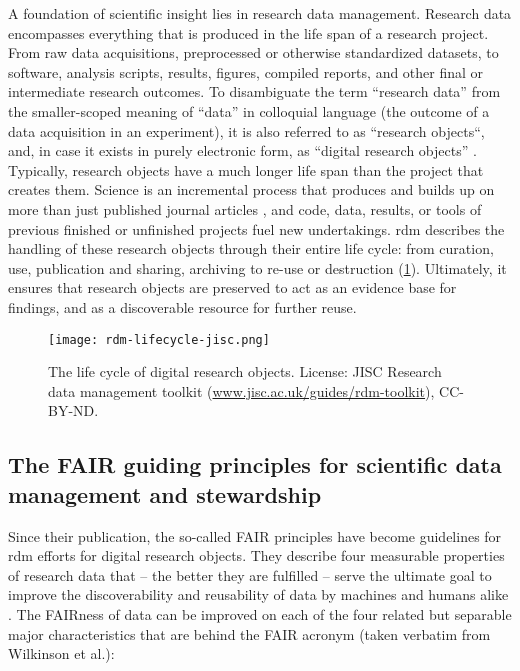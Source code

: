 A foundation of scientific insight lies in research data management.
Research data encompasses everything that is produced in the life span of a research project.
From raw data acquisitions, preprocessed or otherwise standardized datasets, to software, analysis scripts, results, figures, compiled reports, and other final or intermediate research outcomes.
To disambiguate the term ``research data'' from the smaller-scoped meaning of ``data'' in colloquial language (the outcome of a data acquisition in an experiment), it is also referred to as ``research objects``, and, in case it exists in purely electronic form, as ``digital research objects'' \citep{bechhofer2010research}. \\
Typically, research objects have a much longer life span than the project that creates them.
Science is an incremental process that produces and builds up on more than just published journal articles \citep{mons2018data}, and code, data, results, or tools of previous finished or unfinished projects fuel new undertakings.
\gls{rdm} describes the handling of these research objects through their entire life cycle: from curation, use, publication and sharing, archiving to re-use or destruction (\cref{fig:rdm-lifecycle}).
Ultimately, it ensures that research objects are preserved to act as an evidence base for findings, and as a discoverable resource for further reuse.


\begin{figure}[H]
	\centering
	\texttt{[image: rdm-lifecycle-jisc.png]}
	\caption[The life cycle of digital research objects]{The life cycle of digital research objects. License: JISC Research data management toolkit (\href{https://www.jisc.ac.uk/guides/rdm-toolkit}{www.jisc.ac.uk/guides/rdm-toolkit}), CC-BY-ND.}
	\label{fig:rdm-lifecycle}
\end{figure}


\subsection{The FAIR guiding principles for scientific data management and stewardship}

Since their publication, the so-called \gls{FAIR} principles \citep{wilkinson2016fair} have become guidelines for \gls{rdm} efforts for digital research objects.
They describe four measurable properties of research data that -- the better they are fulfilled -- serve the ultimate goal to improve the discoverability and reusability of data by machines and humans alike \citep{wilkinson2016fair}.
The \gls{FAIR}ness of data can be improved on each of the four related but separable major characteristics that are behind the \gls{FAIR} acronym (taken verbatim from Wilkinson et al.):

